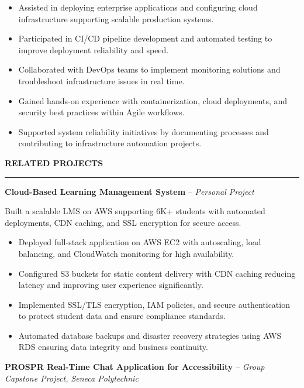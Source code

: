 \documentclass[10pt,letterpaper]{article}
\begin{document}
\begin{itemize}
\item Assisted in deploying enterprise applications and configuring cloud infrastructure supporting scalable production systems.
\item Participated in CI/CD pipeline development and automated testing to improve deployment reliability and speed.
\item Collaborated with DevOps teams to implement monitoring solutions and troubleshoot infrastructure issues in real time.
\item Gained hands-on experience with containerization, cloud deployments, and security best practices within Agile workflows.
\item Supported system reliability initiatives by documenting processes and contributing to infrastructure automation projects.
\end{itemize}

\vspace{6pt}

\textbf{RELATED PROJECTS}\\[-8pt]
\noindent\rule{\textwidth}{1pt}

\vspace{-2pt}

\textbf{Cloud-Based Learning Management System} -- \emph{Personal Project}

\vspace{-1pt}

Built a scalable LMS on AWS supporting 6K+ students with automated deployments, CDN caching, and SSL encryption for secure access.
\vspace{-1pt}
\begin{itemize}
\item Deployed full-stack application on AWS EC2 with autoscaling, load balancing, and CloudWatch monitoring for high availability.
\item Configured S3 buckets for static content delivery with CDN caching reducing latency and improving user experience significantly.
\item Implemented SSL/TLS encryption, IAM policies, and secure authentication to protect student data and ensure compliance standards.
\item Automated database backups and disaster recovery strategies using AWS RDS ensuring data integrity and business continuity.
\end{itemize}

\textbf{PROSPR  Real-Time Chat Application for Accessibility} -- \emph{Group Capstone Project, Seneca Polytechnic}
\end{document}

